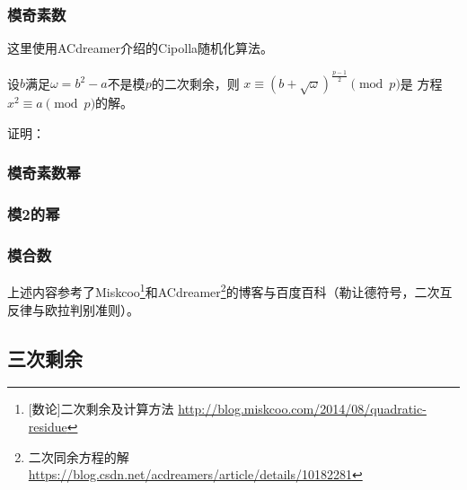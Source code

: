 \subsubsection{模奇素数}
这里使用ACdreamer介绍的Cipolla随机化算法。
\begin{theorem}
    设$b$满足$\omega=b^2-a$不是模$p$的二次剩余，则
    $x\equiv (b+\sqrt{\omega})^\frac{p-1}{2}\pmod{p}$是
    方程$x^2\equiv a\pmod{p}$的解。
\end{theorem}
证明：

\subsubsection{模奇素数幂}
\subsubsection{模2的幂}
\subsubsection{模合数}

上述内容参考了Miskcoo\footnote{
	[数论]二次剩余及计算方法
	\url{http://blog.miskcoo.com/2014/08/quadratic-residue}
}和ACdreamer\footnote{
    二次同余方程的解
    \url{https://blog.csdn.net/acdreamers/article/details/10182281}
}的博客与百度百科（勒让德符号，二次互反律与欧拉判别准则）。
\subsection{三次剩余}

